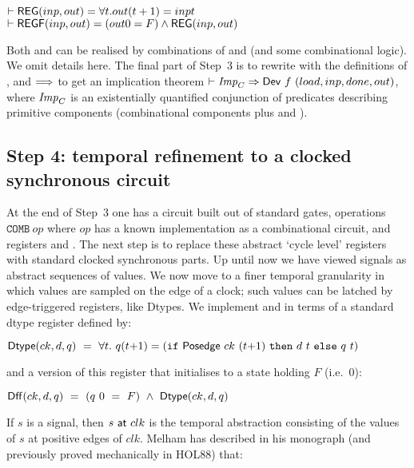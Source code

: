 {\baselineskip16pt\begin{alltt}
\( \vdash \DEF{REG}(inp,out) = {\forall}t. out(t+1) = inp t          \)
\( \vdash \DEF{REGF}(inp,out) = (out 0 = F) \wedge \DEF{REG}(inp,out)\)
\end{alltt}}

Both  and  can be realised by combinations of
 and  (and some combinational logic). We omit
details here. The final part of Step~3 is to rewrite with the
definitions of ,  and $\Longrightarrow$ to get an implication
theorem $\vdash {\it{Imp}}_C \Rightarrow \mathsf{Dev}~f~(load,inp,done,out)$, where ${\it{Imp}}_C$
is an existentially quantified conjunction of predicates describing
primitive components (combinational components plus  and
).

\subsection*{Step 4: temporal refinement to a clocked synchronous circuit}

At the end of Step~3 one has a circuit built out of standard gates,
operations $\texttt{COMB}~op$ where $op$ has a known implementation as
a combinational circuit, and registers  and .  The
next step is to replace these abstract `cycle level' registers with
standard clocked synchronous parts. Up until now we have viewed
signals as abstract sequences of values.  We now move to a finer
temporal granularity in which values are sampled on the edge of a
clock; such values can be latched by edge-triggered registers, like
Dtypes. We implement  and  in terms of a standard
dtype register defined by:

\vspace*{2mm}

$\mathsf{Dtype}(ck,d,q) ~=~ \forall t.~q(t{+}1) = (\texttt{if}~\mathsf{Posedge}~ck~(t{+}1)~\texttt{then}~d~t~\texttt{else}~q~t)$

\vspace*{2mm}

\noindent and a version of this register that initialises to a state holding $F$ (i.e.~$0$):

\vspace*{2mm}

$\mathsf{Dff}(ck,d,q) ~ = ~ (q~0~ =~F)~\wedge~\mathsf{Dtype}(ck,d,q)$

\vspace*{2mm}

If $s$ is a signal, then $s~\mathsf{at}~clk$ is the temporal
abstraction consisting of the values of $s$ at positive edges of
$clk$. 
Melham has described in his monograph (and previously proved mechanically in HOL88) that:




